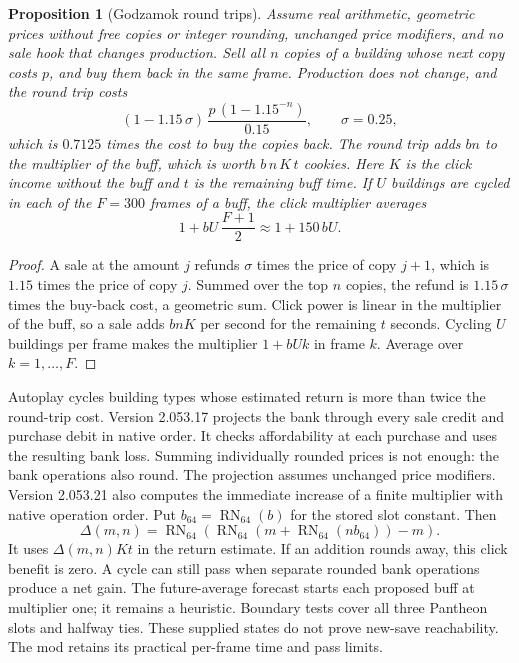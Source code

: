 \documentclass[11pt,a4paper]{article}
\numberwithin{equation}{section}
\newtheorem{proposition}[theorem]{Proposition}
\theoremstyle{definition}
\theoremstyle{remark}
\begin{document}
\begin{proposition}[Godzamok round trips]\label{prop:godzamok}
Assume real arithmetic, geometric prices without free copies or integer rounding, unchanged price modifiers, and no sale hook that changes production. Sell all $n$ copies of a building whose next copy costs $p$, and buy them back in the same frame. Production does not change, and the round trip costs
\begin{equation}\label{eq:round-trip}
 (1-1.15\,\sigma)\,\frac{p\,(1-1.15^{-n})}{0.15},\qquad\sigma=0.25,
\end{equation}
which is $0.7125$ times the cost to buy the copies back. The round trip adds $bn$ to the multiplier of the buff, which is worth $b\,n\,K\,t$ cookies. Here $K$ is the click income without the buff and $t$ is the remaining buff time. If $U$ buildings are cycled in each of the $F=300$ frames of a buff, the click multiplier averages
\begin{equation}\label{eq:devastation}
 1+bU\,\frac{F+1}2\approx1+150\,bU.
\end{equation}
\end{proposition}

\begin{proof}
A sale at the amount $j$ refunds $\sigma$ times the price of copy $j+1$, which is $1.15$ times the price of copy $j$. Summed over the top $n$ copies, the refund is $1.15\,\sigma$ times the buy-back cost, a geometric sum. Click power is linear in the multiplier of the buff, so a sale adds $bnK$ per second for the remaining $t$ seconds. Cycling $U$ buildings per frame makes the multiplier $1+bUk$ in frame $k$. Average over $k=1,\ldots,F$.
\end{proof}

Autoplay cycles building types whose estimated return is more than twice the round-trip cost. Version 2.053.17 projects the bank through every sale credit and purchase debit in native order. It checks affordability at each purchase and uses the resulting bank loss. Summing individually rounded prices is not enough: the bank operations also round. The projection assumes unchanged price modifiers. Version 2.053.21 also computes the immediate increase of a finite multiplier with native operation order. Put $b_{64}=\operatorname{RN}_{64}(b)$ for the stored slot constant. Then
\[
 \Delta(m,n)=\operatorname{RN}_{64}\!\left(
   \operatorname{RN}_{64}\!\left(m+\operatorname{RN}_{64}(nb_{64})\right)-m\right).
\]
It uses $\Delta(m,n)Kt$ in the return estimate. If an addition rounds away, this click benefit is zero. A cycle can still pass when separate rounded bank operations produce a net gain. The future-average forecast starts each proposed buff at multiplier one; it remains a heuristic. Boundary tests cover all three Pantheon slots and halfway ties. These supplied states do not prove new-save reachability. The mod retains its practical per-frame time and pass limits.
\end{document}

